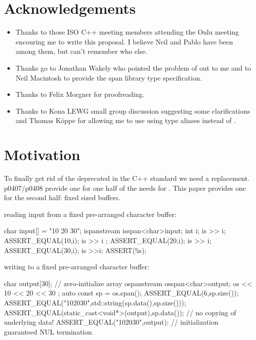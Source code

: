 \documentclass[ebook,11pt,article]{memoir}
\begin{document}
\chapter{Acknowledgements}
\begin{itemize}
\item Thanks to those ISO C++ meeting members attending the Oulu meeting encouring me to write this proposal. I believe Neil and Pablo have been among them, but can't remember who else.
\item Thanks go to Jonathan Wakely who pointed the problem of  out to me and to Neil Macintosh to provide the span library type specification.
\item Thanks to Felix Morgner for proofreading.
\item Thanks to Kona LEWG small group discussion suggesting some clarifications and Thomas K\"oppe for allowing me to use using type aliases instead of .
\end{itemize}

\chapter{Motivation}
To finally get rid of the deprecated  in the C++ standard we need a replacement. p0407/p0408 provide one for one half of the needs for . This paper provides one for the second half: fixed sized buffers. 

\begin{example} reading input from a fixed pre-arranged character buffer:
\begin{codeblock}
char input[] = "10 20 30";
ispanstream is{span<char>{input}};
int i;
is >> i;
ASSERT_EQUAL(10,i);
is >> i ;
ASSERT_EQUAL(20,i);
is >> i;
ASSERT_EQUAL(30,i);
is >>i;
ASSERT(!is);
\end{codeblock}
\end{example}
\begin{example} writing to a fixed pre-arranged character buffer:
\begin{codeblock}
char  output[30]{}; // zero-initialize array
ospanstream os{span<char>{output}};
os << 10 << 20 << 30 ;
auto const sp = os.span();
ASSERT_EQUAL(6,sp.size());
ASSERT_EQUAL("102030",std::string(sp.data(),sp.size()));
ASSERT_EQUAL(static_cast<void*>(output),sp.data()); // no copying of underlying data!
ASSERT_EQUAL("102030",output); // initialization guaranteed NUL termination
\end{codeblock}
\end{example}
\end{document}
